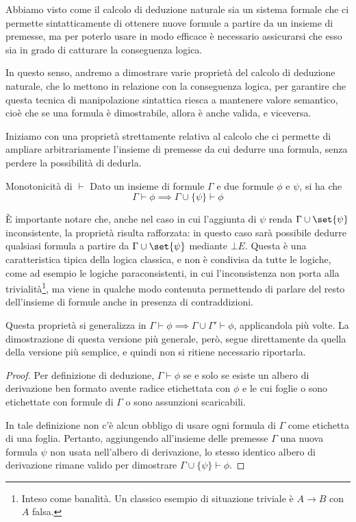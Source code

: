Abbiamo visto come il calcolo di deduzione naturale sia un sistema formale che ci permette sintatticamente di ottenere nuove formule a partire da un insieme di premesse, ma per poterlo usare in modo efficace è necessario assicurarsi che esso sia in grado di catturare la conseguenza logica.

In questo senso, andremo a dimostrare varie proprietà del calcolo di deduzione naturale, che lo mettono in relazione con la conseguenza logica, per garantire che questa tecnica di manipolazione sintattica riesca a mantenere valore semantico, cioè che se una formula è dimostrabile, allora è anche valida, e viceversa.

Iniziamo con una proprietà strettamente relativa al calcolo che ci permette di ampliare arbitrariamente l'insieme di premesse da cui dedurre una formula, senza perdere la possibilità di dedurla.

\begin{theorem}[namedlabel={thm:monotonicity}{Monotonicità}]{Monotonicità di \(\vdash\)}
  Dato un insieme di formule \(\Gamma\) e due formule \(\phi\) e \(\psi\), si ha che
  \[\Gamma \vdash \phi \implies \Gamma \cup \{\psi\} \vdash \phi\]
\end{theorem}

È importante notare che, anche nel caso in cui l'aggiunta di \(\psi\) renda \(\Gamma \cup \set{\psi}\) inconsistente, la proprietà risulta rafforzata: in questo caso sarà possibile dedurre qualsiasi formula a partire da \(\Gamma \cup \set{\psi}\) mediante \(\bot E\). Questa è una caratteristica tipica della logica classica, e non è condivisa da tutte le logiche, come ad esempio le logiche paraconsistenti, in cui l'inconsistenza non porta alla trivialità\footnote{Inteso come banalità. Un classico esempio di situazione triviale è \(A \to B\) con \(A\) falsa.}, ma viene in qualche modo contenuta permettendo di parlare del resto dell'insieme di formule anche in presenza di contraddizioni.

\begin{note}{}
  Questa proprietà si generalizza in \(\Gamma \vdash \phi \implies \Gamma \cup \Gamma' \vdash \phi\), applicandola più volte. La dimostrazione di questa versione più generale, però, segue direttamente da quella della versione più semplice, e quindi non si ritiene necessario riportarla.
\end{note}

\begin{proof}
  Per definizione di deduzione, \(\Gamma \vdash \phi\) se e solo se esiste un albero di derivazione ben formato avente radice etichettata con \(\phi\) e le cui foglie o sono etichettate con formule di \(\Gamma\) o sono assunzioni scaricabili. 

  In tale definizione non c'è alcun obbligo di usare ogni formula di \(\Gamma\) come etichetta di una foglia. Pertanto, aggiungendo all'insieme delle premesse \(\Gamma\) una nuova formula \(\psi\) non usata nell'albero di derivazione, lo stesso identico albero di derivazione rimane valido per dimostrare \(\Gamma \cup \{\psi\} \vdash \phi\).
\end{proof}

